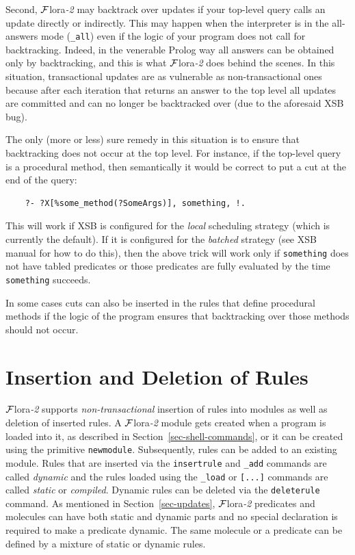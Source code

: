\documentclass[11pt]{article}
\newcommand{\FLORA}{{\mbox{\sc ${\cal F}${lora}\rm\emph{-2}}}\xspace}
\begin{document}
Second, \FLORA may backtrack over updates if your top-level query calls an
update directly or indirectly. This may happen when the interpreter is in
the all-answers mode ({\tt \_all}) even if the logic of your program does
not call for backtracking. Indeed, in the venerable Prolog way all answers
can be obtained only by backtracking, and this is what \FLORA does behind
the scenes. In this situation, transactional updates are as vulnerable as
non-transactional ones because after each iteration that returns an answer
to the top level all updates are committed and can no longer be backtracked
over (due to the aforesaid XSB bug).

The only (more or less) sure remedy in this situation is to ensure that
backtracking does not occur at the top level. For instance, if the
top-level query is a procedural method, then semantically it would be
correct to put a cut at the end of the query:
\begin{verbatim}
    ?- ?X[%some_method(?SomeArgs)], something, !.
\end{verbatim}
This will work if XSB is configured for the \emph{local} scheduling
strategy (which is currently the default). If it is configured for
the \emph{batched} strategy (see XSB manual for how to do this), then the
above trick will work only if {\tt something} does not have tabled
predicates or those predicates are fully evaluated by the time {\tt
  something} succeeds.

In some cases cuts can also be inserted in the rules that define procedural
methods if the logic of the program ensures that backtracking over those
methods should not occur. 


\section{Insertion and Deletion of Rules}

\FLORA supports \emph{non-transactional} insertion of rules into modules as
well as deletion of inserted rules.  A \FLORA module gets created when a
program is loaded into it, as described in
Section~\ref{sec-shell-commands}, or it can be created using the primitive
{\tt newmodule}. Subsequently, rules can be added to an existing module.
Rules that are inserted via the {\tt insertrule} and {\tt \_add} commands
are called \emph{dynamic} and the rules loaded using the {\tt \_load} or
{\tt [...]} commands are called \emph{static} or \emph{compiled}.  Dynamic
rules can be deleted via the {\tt deleterule} command. As mentioned in
Section~\ref{sec-updates}, \FLORA predicates and molecules can have both
static and dynamic parts and no special declaration is required to make a
predicate dynamic. The same molecule or a predicate can be defined by a
mixture of static or dynamic rules.
\end{document}

